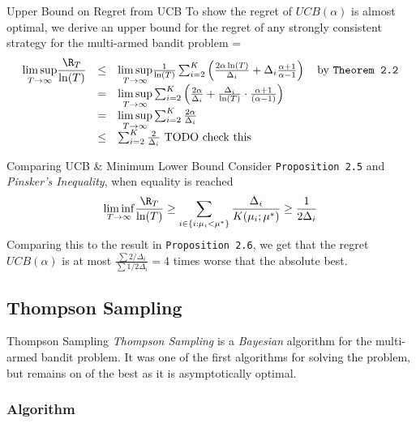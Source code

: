 \documentclass[11pt,a4paper]{article}
\begin{document}
  \begin{proposition}{Upper Bound on Regret from UCB}
    To show the regret of $UCB(\alpha)$ is almost optimal, we derive an upper bound for the regret of any strongly consistent strategy for the multi-armed bandit problem
    \everymath={\displaystyle}
    \[\begin{array}{rcl}
      \underset{T\to\infty}{\lim\sup}\dfrac{\R_T}{\ln(T)}&\leq&\underset{T\to\infty}{\lim\sup}\frac1{\ln(T)}\sum_{i=2}^K\left(\frac{2\alpha\ln(T)}{\Delta_i}+\Delta_i\frac{\alpha+1}{\alpha-1}\right)\quad\text{by \texttt{Theorem 2.2}}\\
      &=&\underset{T\to\infty}{\lim\sup}\sum_{i=2}^K\left(\frac{2\alpha}{\Delta_i}+\frac{\Delta_i}{\ln(T)}\cdot\frac{\alpha+1}{(\alpha-1)}\right)\\
      &=&\underset{T\to\infty}{\lim\sup}\sum_{i=2}^K\frac{2\alpha}{\Delta_i}\\
      &\leq&\sum_{i=2}^K\frac2{\Delta_i} \text{ TODO check this}
    \end{array}\]
  \end{proposition}

  \begin{proposition}{Comparing UCB \& Minimum Lower Bound}
    Consider \texttt{Proposition 2.5}  and \textit{Pinsker's Inequality}, when equality is reached
    \[ \underset{T\to\infty}{\lim\inf}\dfrac{\R_T}{\ln(T)}\geq\sum_{i\in\{i:\mu_i<\mu^*\}}\frac{\Delta_i}{K(\mu_i;\mu^*)}\geq\frac1{2\Delta_i} \]
    Comparing this to the result in \texttt{Proposition 2.6}, we get that the regret $UCB(\alpha)$ is at most $\frac{\sum 2/\Delta_i}{\sum 1/2\Delta_i}=4$ times worse that the absolute best.
  \end{proposition}

\subsection{Thompson Sampling}

\begin{remark}{Thompson Sampling}
  \textit{Thompson Sampling} is a \textit{Bayesian} algorithm for the multi-armed bandit problem. It was one of the first algorithms for solving the problem, but remains on of the best as it is asymptotically optimal.
\end{remark}

\subsubsection{Algorithm}
\end{document}
